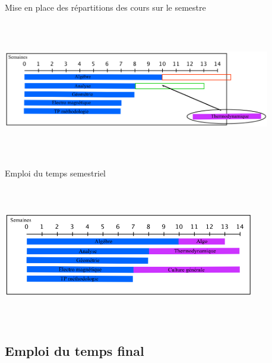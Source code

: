 \documentclass{beamer}
\begin{document}
\begin{frame}
Mise en place des répartitions des cours sur le semestre
\begin{center}
\includegraphics [width=117mm, height=60mm]{RepartitionSemestre2.png}
\end{center}
\end{frame}

\begin{frame}
Emploi du temps semestriel
\begin{center}
\includegraphics [width=110mm, height=60mm]{RepartitionSemestre.png}
\end{center}
\end{frame}

\subsection{Emploi du temps final}
\begin{frame}

\end{frame}
\end{document}
